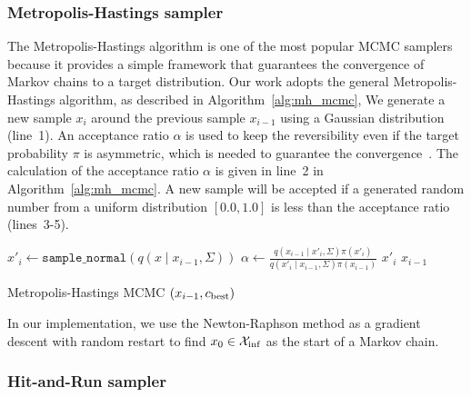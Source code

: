 \documentclass[letterpaper, 10 pt, conference]{ieeeconf}  %
\begin{document}
\subsubsection{Metropolis-Hastings sampler}


The Metropolis-Hastings algorithm is one of the most popular MCMC samplers~\cite{CG95} because it provides a simple  framework that guarantees the convergence of Markov chains to a target distribution.
Our work adopts the general Metropolis-Hastings algorithm, as described in Algorithm~\ref{alg:mh_mcmc}, 
We generate a new sample $ x_{i}$ around the previous sample $ x_{i-1}$ using a Gaussian distribution (line~1).
An acceptance ratio $ \alpha $ is used to keep the reversibility even if the target probability $ \pi $ is asymmetric, which is needed to guarantee the convergence~\cite{CG95}. 
The calculation of the acceptance ratio $ \alpha $ is given in line~2 in Algorithm~\ref{alg:mh_mcmc}.
A new sample will be accepted if a generated random number from a uniform distribution $[0.0, 1.0 ] $ is less than the acceptance ratio (lines~3-5). 


\begin{algorithm}[t]
	\begin{algorithmic}[1]
		\STATE $ x'_{i} \leftarrow \texttt{sample\_normal}( q ( x \mid x_{i-1},\Sigma) ) $ 
		\label{start}
		\STATE $ \alpha \leftarrow \frac{ q ( x_{i-1} \mid x'_{i},\Sigma) \pi( x'_{i} ) }{ q ( x'_{i} \mid x_{i-1},\Sigma) \pi( x_{i-1} ) } $
            \RETURN $ x'_{i} $
		\ENDIF
		\RETURN $ x_{i-1} $
	\end{algorithmic}
	\caption{\captionstyle Metropolis-Hastings MCMC $(x_{i-1}, c_{\rm best})$}
	\label{alg:mh_mcmc}	
\end{algorithm}

In our implementation, we use the Newton-Raphson method as a gradient descent with random restart to find $ x_0 \in \mathcal{X}_{\rm {inf}} $ as the start of a Markov chain.


\subsubsection{Hit-and-Run sampler}
\end{document}
